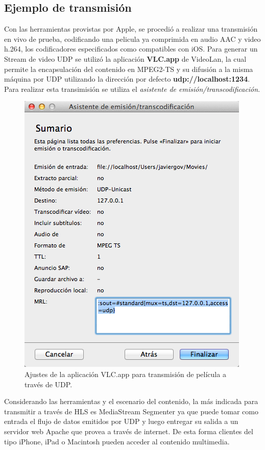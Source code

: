 	\subsection{Ejemplo de transmisión}

Con las herramientas provistas por Apple, se procedió a realizar una transmisión en vivo de prueba, codificando una pelicula ya comprimida en audio AAC y video h.264, los codificadores especificados como compatibles con iOS. Para generar un Stream de video UDP se utilizó la aplicación \textbf{VLC.app} de VideoLan, la cual permite la encapsulación del contenido en MPEG2-TS y su difusión a la misma máquina por UDP utilizando la dirección por defecto \textbf{udp://localhost:1234}. Para realizar esta transimisión se utiliza el \textit{asistente de emisión/transcodificación}.\\

\begin{figure}[h!]
	\centering
	\includegraphics[scale=0.5]{imgs/vlc_transmission.png}
	\caption{Ajustes de la aplicación VLC.app para transmisión de película a través de UDP.}
	\label{vlc_transmission}	
\end{figure}


Considerando las herramientas y el escenario del contenido, la más indicada para transmitir a través de HLS es MediaStream Segmenter ya que puede tomar como entrada el flujo de datos emitidos por UDP y luego entregar su salida a un servidor web Apache que provea a través de internet. De esta forma clientes del tipo iPhone, iPad o Macintosh pueden acceder al contenido multimedia.\\

